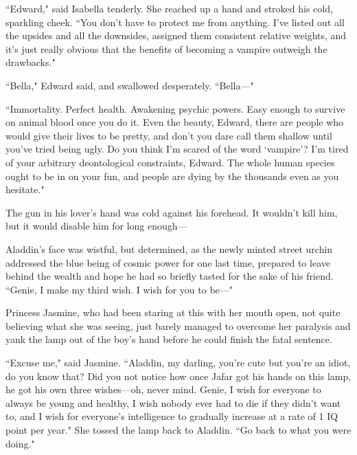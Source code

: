 ``Edward," said Isabella tenderly. She reached up a hand and stroked his cold, sparkling cheek. ``You don't have to protect me from anything. I've listed out all the upsides and all the downsides, assigned them consistent relative weights, and it's just really obvious that the benefits of becoming a vampire outweigh the drawbacks."

``Bella," Edward said, and swallowed desperately. ``Bella—"

``Immortality. Perfect health. Awakening psychic powers. Easy enough to survive on animal blood once you do it. Even the beauty, Edward, there are people who would give their lives to be pretty, and don't you dare call them shallow until you've tried being ugly. Do you think I'm scared of the word `vampire'? I'm tired of your arbitrary deontological constraints, Edward. The whole human species ought to be in on your fun, and people are dying by the thousands even as you hesitate."

The gun in his lover's hand was cold against his forehead. It wouldn't kill him, but it would disable him for long enough—


Aladdin's face was wistful, but determined, as the newly minted street urchin addressed the blue being of cosmic power for one last time, prepared to leave behind the wealth and hope he had so briefly tasted for the sake of his friend. ``Genie, I make my third wish. I wish for you to be—"

Princess Jasmine, who had been staring at this with her mouth open, not quite believing what she was seeing, just barely managed to overcome her paralysis and yank the lamp out of the boy's hand before he could finish the fatal sentence.

``Excuse me," said Jasmine. ``Aladdin, my darling, you're cute but you're an idiot, do you know that? Did you not notice how once Jafar got his hands on this lamp, he got his own three wishes—oh, never mind. Genie, I wish for everyone to always be young and healthy, I wish nobody ever had to die if they didn't want to, and I wish for everyone's intelligence to gradually increase at a rate of 1 IQ point per year." She tossed the lamp back to Aladdin. ``Go back to what you were doing."

%

